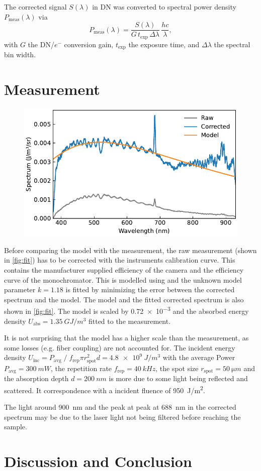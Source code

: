 \documentclass[
	a4paper,
]{scrarticle}
\begin{document}
The corrected signal \(S(\lambda)\) in DN was converted to spectral power density \(P_{\text{meas}}(\lambda)\) via
\begin{equation}
  P_{\text{meas}}(\lambda)
  = \frac{S(\lambda)}{G\,t_{\text{exp}}\,\Delta\lambda}\,\frac{hc}{\lambda},
\end{equation}
with \(G\) the DN/\(e^-\) conversion gain, \(t_{\text{exp}}\) the exposure time, and \(\Delta\lambda\) the spectral bin width.  

\clearpage
\section{Measurement}
\begin{figure}[h]
    \centering
    \includegraphics{../analysis/figures/combined.fit.pdf}
    \caption{}
    \label{fig:fit}
\end{figure}
Before comparing the model with the measurement, the raw measurement (shown in \autoref{fig:fit}) has to be corrected with the instruments calibration curve.
This contains the manufacturer supplied efficiency of the camera \cite{andorIXonEM897Manual} and the efficiency curve of the monochromator.
This is modelled using \autocite{barkerRippleCorrectionHighdispersion1984} and the unknown model parameter $k=1.18$ is fitted by minimizing the error between the corrected spectrum and the model.
The model and the fitted corrected spectrum is also shown in \autoref{fig:fit}.
The model is scaled by \SI{0.72e-3}{} and the absorbed energy density $U_\text{abs} = \SI{1.35}{GJ/m^3}$ fitted to the measurement.

It is not surprising that the model has a higher scale than the measurement, as some losses (e.g. fiber coupling) are not accounted for.
The incident energy density $U_\text{inc} = P_\text{avg} \; / \; f_\text{rep} \pi r_\text{spot}^2 d = \SI{4.8e9}{J/m^3}$ with the average Power $P_\text{avg}=\SI{300}{mW}$, the repetition rate $f_\text{rep}=\SI{40}{kHz}$, the spot size $r_\text{spot}=\SI{50}{\micro m}$ and the absorption depth $d=\SI{200}{nm}$ \cite{smauszDeterminationUVVisible2017} is more due to some light being reflected and scattered. It correspondence with a incident fluence of \SI{950}{J/m^2}. 

The light around \SI{900}{nm} and the peak at peak at \SI{688}{nm} in the corrected spectrum may be due to the laser light not being filtered before reaching the sample.

\section{Discussion and Conclusion}

\clearpage
\printbibliography
\end{document}
